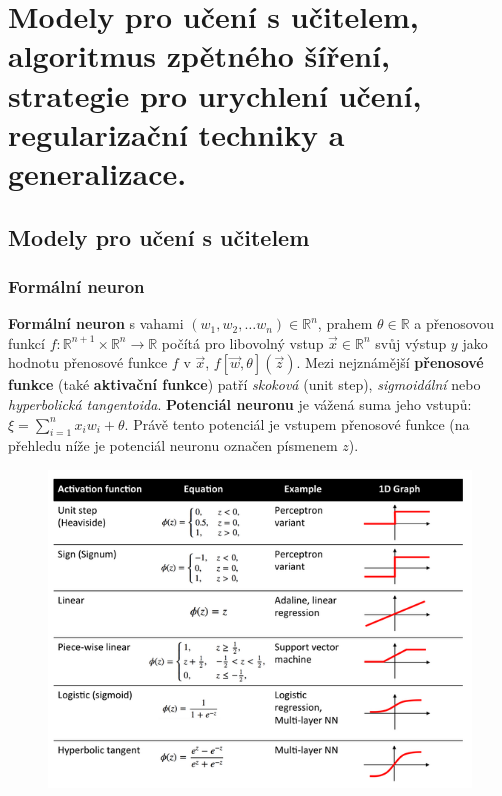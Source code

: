 \documentclass[11pt]{report} %
\newcommand{\R}{\mathbb{R}}
\begin{document}
\section{Modely pro učení s učitelem, algoritmus zpětného šíření, strategie pro urychlení učení, regularizační techniky a generalizace.}

\subsection{Modely pro učení s učitelem}
\subsubsection{Formální neuron}
\textbf{Formální neuron} s vahami $(w_1, w_2, \dots w_n) \in \R^n$, prahem $\theta \in \R$ a přenosovou funkcí $f : \R^{n+1} \times \R^n \rightarrow \R$ počítá pro libovolný vstup $\vec{x} \in \R^n$ svůj výstup $y$ jako hodnotu přenosové funkce $f$ v $\vec{x}$, $f[\vec{w}, \theta](\vec{z})$. Mezi nejznámější \textbf{přenosové funkce} (také \textbf{aktivační funkce}) patří \textit{skoková} (unit step), \textit{sigmoidální} nebo \textit{hyperbolická tangentoida}. \textbf{Potenciál neuronu} je vážená suma jeho vstupů: $\xi = \sum\limits_{i=1}^n x_i w_i + \theta$. Právě tento potenciál je vstupem přenosové funkce (na přehledu níže je potenciál neuronu označen písmenem $z$).

\begin{figure}[H]
	\centering
	\includegraphics[scale=0.7]{img/activation_functions.png}
\end{figure}
\end{document}
